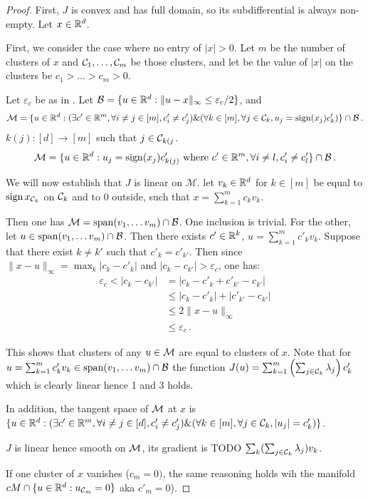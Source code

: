 \begin{proof}
  First, $J$ is convex and has full domain, so its subdifferential is always non-empty.
  Let $x \in \mathbb{R}^d$.

  First, we consider the case where no entry of $\lvert x\rvert >0$.
  Let $m$ be the number of clusters of $x$ and $\mathcal{C}_1, \ldots, \mathcal{C}_m$ be those clusters, and let be the  value of  $\lvert x \rvert$ on the clusters be $c_1 > \ldots > c_m > 0$.

  Let $\varepsilon_c$ be as in .
  Let $\mathcal{B} = \{u \in \mathbb{R}^d: \lVert u - x \rVert_\infty \leq \varepsilon_c / 2\}$,
  and
  \begin{equation}
    \mathcal{M} = \{ u \in \mathbb{R}^d : (\exists c' \in \mathbb{R}^m, \forall i \neq j \in [m], c'_i \neq c'_j) \& (\forall k \in [m], \forall j \in \mathcal{C}_k, u_j = \operatorname{sign}(x_j) c'_k) \} \cap \mathcal{B} \, .
  \end{equation}
  $k(j):[d] \rightarrow [m]$  such that $j \in \mathcal{C}_{k(j}$.
 \begin{equation}
    \mathcal{M} = \{ u \in \mathbb{R}^d : u_j = \operatorname{sign}(x_j) c'_{k(j)}\mbox{ where }  c' \in \mathbb{R}^m, \forall i \neq l , c'_i \neq c'_l \} \cap \mathcal{B} \, .
  \end{equation}

We will now establish that $J$ is linear on $\mathcal{M}$. 
  let $v_k \in \mathbb{R}^d$ for $k \in [m]$  be equal to $\operatorname{sign} x_{\mathcal{C}_k}$ on $\mathcal{C}_k$ and to 0 outside, such that $x = \sum_{k=1}^m c_k v_k$.


  Then one has $\mathcal{M} = \operatorname{span}(v_1, \ldots v_m) \cap \mathcal{B}$.
  One inclusion is trivial.
  For the other, let $u \in \operatorname{span}(v_1, \ldots v_m) \cap \mathcal{B}$.
  Then there exists $c' \in \mathbb{R}^k$, $u = \sum_{k=1}^m c'_k v_k$.
  Suppose that there exist $k \neq k'$ such that $c'_k = c'_{k'}$.
  Then since $\lVert x - u \rVert_\infty = \max_k |c_k - c'_k|$ and $|c_k - c_{k'}| > \varepsilon_c$, one has:
  \begin{align*}
     \varepsilon_c < |c_k - c_{k'}|
     &= |c_k - c'_k + c'_{k'} - c_{k'}| \\
     &\leq |c_k - c'_k| + |c'_{k'} - c_{k'}| \\
     &\leq 2 \lVert x - u \rVert_\infty \\
     &\leq  \varepsilon_c \, .
  \end{align*}

  This shows that clusters of any $u \in \mathcal{M}$ are equal to clusters of $x$.
  Note that for $u =\sum_{k=1}^m c'_k v_k\in \operatorname{span}(v_1, \ldots v_m) \cap \mathcal{B}$ the function $J(u) = \sum_{k=1}^m \left( \sum_{j \in \mathcal{C}_k} \lambda_j \right)c_k'$ which is clearly linear hence 1 and 3 holds.

  
  In addition, the tangent space of $\mathcal{M}$ at $x$ is $\{ u \in \mathbb{R}^d : (\exists c' \in \mathbb{R}^m, \forall i \neq j \in [d], c'_i \neq c'_j) \& (\forall k \in [m], \forall j \in \mathcal{C}_k, |u_j| = c'_k) \}$.

  $J$ is linear hence smooth on $\mathcal{M}$, its gradient is TODO $\sum_k (\sum_{j \in \mathcal{C}_k} \lambda_j) v_k$. 

  If one cluster of $x$ vanishes ($c_m = 0)$, the same reasoning holds wih the manifold $cM \cap \{u \in \mathbb{R}^d: u_{\mathcal{C}_m} = 0\}$ aka $c'_m = 0$).
\end{proof}
